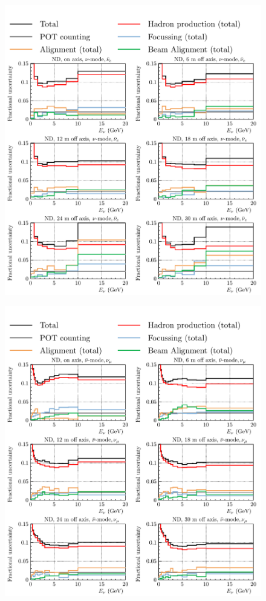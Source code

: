 \documentclass{article}
\begin{document}
\begin{figure}
  \includegraphics[width=\textwidth]{plots/fracerrs/numode_nuebar_ErrType_OffAxis}
  \caption{}
  \label{fig:grp_nu_nuebar_offaxis}
\end{figure}

\begin{figure}
  \includegraphics[width=\textwidth]{plots/fracerrs/nubarmode_numu_ErrType_OffAxis}
  \caption{}
  \label{fig:grp_nubar_numu_offaxis}
\end{figure}
\end{document}
